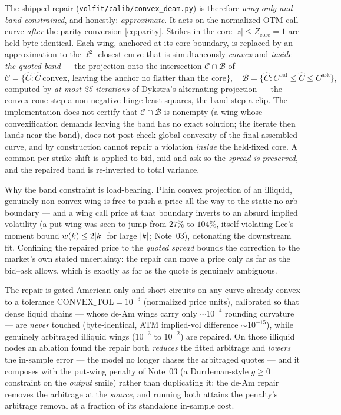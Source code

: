 \documentclass[11pt]{article}
\begin{document}
The shipped repair (\texttt{volfit/calib/convex\_deam.py}) is therefore
\emph{wing-only and band-constrained}, and honestly: \emph{approximate}. It acts
on the normalized OTM call curve \emph{after} the parity conversion
\eqref{eq:parity}. Strikes in the core $|z|\le Z_{\text{core}}=1$ are held
byte-identical. Each wing, anchored at its core boundary, is replaced by an
approximation to the $\ell^2$-closest curve that is simultaneously \emph{convex}
and \emph{inside the quoted band} --- the projection onto the intersection
$\mathcal C\cap\mathcal B$ of
\begin{equation}
\mathcal C=\{\hat C:\hat C\ \text{convex, leaving the anchor no flatter than the
core}\},\quad
\mathcal B=\{\hat C:C^{\text{bid}}\le\hat C\le C^{\text{ask}}\},
\label{eq:convex_sets}
\end{equation}
computed by \emph{at most 25 iterations} of Dykstra's alternating projection ---
the convex-cone step a non-negative-hinge least squares, the band step a clip.
The implementation does not certify that $\mathcal C\cap\mathcal B$ is nonempty
(a wing whose convexification demands leaving the band has no exact solution;
the iterate then lands near the band), does not post-check global convexity of
the final assembled curve, and by construction cannot repair a violation
\emph{inside} the held-fixed core. A common per-strike shift is applied to bid,
mid and ask so the \emph{spread is preserved}, and the repaired band is
re-inverted to total variance.

\begin{heuristic}
Why the band constraint is load-bearing. Plain convex projection of an illiquid,
genuinely non-convex wing is free to push a price all the way to the static
no-arb boundary --- and a wing call price at that boundary inverts to an absurd
implied volatility (a put wing was seen to jump from $27\%$ to $104\%$, itself
violating Lee's moment bound $w(k)\le2|k|$ for large $|k|$;
Note~03), detonating the downstream fit. Confining the repaired price to the
\emph{quoted spread} bounds the correction to the market's own stated
uncertainty: the repair can move a price only as far as the bid--ask allows,
which is exactly as far as the quote is genuinely ambiguous.
\end{heuristic}

The repair is gated American-only and short-circuits on any curve already convex
to a tolerance $\text{CONVEX\_TOL}=10^{-3}$ (normalized price units), calibrated
so that dense liquid chains --- whose de-Am wings carry only $\sim\!10^{-4}$
rounding curvature --- are \emph{never} touched (byte-identical, ATM implied-vol
difference $\sim10^{-15}$), while genuinely arbitraged illiquid wings ($10^{-3}$
to $10^{-2}$) are repaired. On those illiquid nodes an ablation found the repair
both \emph{reduces} the fitted arbitrage and \emph{lowers} the in-sample error
--- the model no longer chases the arbitraged quotes --- and it composes with
the put-wing penalty of Note~03 (a Durrleman-style $g\ge0$ constraint on the
\emph{output} smile) rather than duplicating it: the de-Am repair removes the
arbitrage at the \emph{source}, and running both attains the penalty's
arbitrage removal at a fraction of its standalone in-sample cost.
\end{document}
